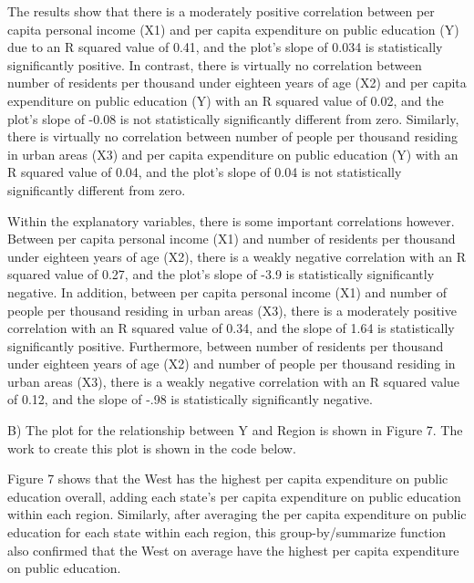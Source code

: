 \documentclass[12pt,letterpaper]{article}
\begin{document}
\vspace{.5cm}
\noindent The results show that there is a moderately positive correlation between per capita personal income (X1) and per capita expenditure on public education (Y) due to an R squared value of 0.41, and the plot’s slope of 0.034 is statistically significantly positive. In contrast, there is virtually no correlation between number of residents per thousand under eighteen years of age (X2) and per capita expenditure on public education (Y) with an R squared value of 0.02, and the plot’s slope of -0.08 is not statistically significantly different from zero. Similarly, there is virtually no correlation between number of people per thousand residing in urban areas (X3) and per capita expenditure on public education (Y) with an R squared value of 0.04, and the plot’s slope of 0.04 is not statistically significantly different from zero.

\vspace{.5cm}

\noindent Within the explanatory variables, there is some important correlations however. Between per capita personal income (X1) and number of residents per thousand under eighteen years of age (X2), there is a weakly negative correlation with an R squared value of 0.27, and the plot’s slope of -3.9 is statistically significantly negative. In addition, between per capita personal income (X1) and number of people per thousand residing in urban areas (X3), there is a moderately positive correlation with an R squared value of 0.34, and the slope of 1.64 is statistically significantly positive. Furthermore, between number of residents per thousand under eighteen years of age (X2) and number of people per thousand residing in urban areas (X3), there is a weakly negative correlation with an R squared value of 0.12, and the slope of -.98 is statistically significantly negative.

\vspace{.5cm}

\noindent B) The plot for the relationship between Y and Region is shown in Figure 7. The work to create this plot is shown in the code below.

\vspace{.5cm}

  

\vspace{.5cm}

\noindent Figure 7 shows that the West has the highest per capita expenditure on public education overall, adding each state's per capita expenditure on public education within each region. Similarly, after averaging the per capita expenditure on public education for each state within each region, this group-by/summarize function also confirmed that the West on average have the highest per capita expenditure on public education.
\end{document}
